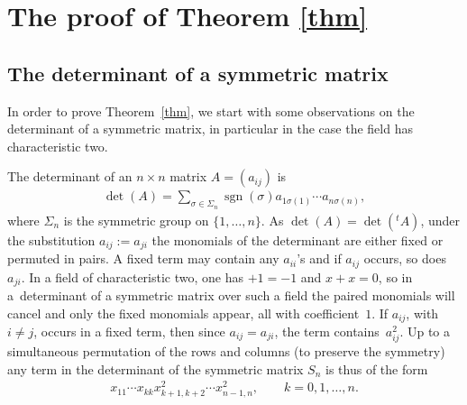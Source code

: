\documentclass[pdftex]{sigma}
\numberwithin{equation}{section}
\begin{document}
\section{The proof of Theorem \ref{thm}} \label{secthm}

\subsection{The determinant of a symmetric matrix}\label{termsn}
In order to prove Theorem~\ref{thm}, we start with some observations on the determinant of a symmetric matrix, in particular in the case the field has characteristic two.

The determinant of an $n\times n$ matrix $A=(a_{ij})$ is
\begin{gather*}
\det(A) = \sum_{\sigma\in\Sigma_n}\operatorname{sgn}(\sigma) a_{1\sigma(1)}\cdots a_{n\sigma(n)},
\end{gather*}
where $\Sigma_n$ is the symmetric group on $\{1,\ldots,n\}$. As $\det(A)=\det({}^tA)$, under the substitution $a_{ij}:=a_{ji}$ the monomials of the determinant are either fixed or permuted in pairs. A fixed term may contain any $a_{ii}$'s and if $a_{ij}$ occurs, so does $a_{ji}$. In a field of characteristic two, one has $+1=-1$ and $x+x=0$, so in a~determinant of a symmetric matrix over such a field the paired monomials will cancel and only the fixed monomials appear, all with coefficient~$1$. If $a_{ij}$, with $i\ne j$, occurs in a fixed term, then since $a_{ij}=a_{ji}$, the term contains~$a_{ij}^2$. Up to a simultaneous permutation of the rows and columns (to preserve the symmetry) any term in the determinant of the symmetric matrix $S_n$ is thus of the form
\begin{gather*}
x_{11}\cdots x_{kk}x_{k+1,k+2}^2\cdots x_{n-1,n}^2,\qquad k=0,1,\ldots, n .
\end{gather*}
\end{document}
